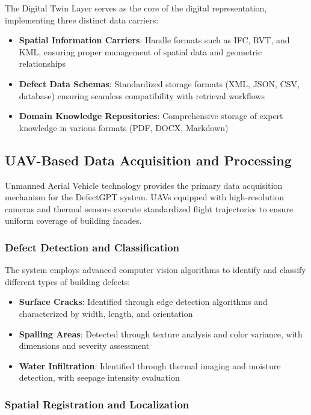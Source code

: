 The Digital Twin Layer serves as the core of the digital representation, implementing three distinct data carriers:

\begin{itemize}
    \item \textbf{Spatial Information Carriers}: Handle formats such as IFC, RVT, and KML, ensuring proper management of spatial data and geometric relationships
    \item \textbf{Defect Data Schemas}: Standardized storage formats (XML, JSON, CSV, database) ensuring seamless compatibility with retrieval workflows
    \item \textbf{Domain Knowledge Repositories}: Comprehensive storage of expert knowledge in various formats (PDF, DOCX, Markdown)
\end{itemize}

\subsection{UAV-Based Data Acquisition and Processing}

Unmanned Aerial Vehicle technology provides the primary data acquisition mechanism for the DefectGPT system. UAVs equipped with high-resolution cameras and thermal sensors execute standardized flight trajectories to ensure uniform coverage of building facades.

\subsubsection{Defect Detection and Classification}

The system employs advanced computer vision algorithms to identify and classify different types of building defects:

\begin{itemize}
    \item \textbf{Surface Cracks}: Identified through edge detection algorithms and characterized by width, length, and orientation
    \item \textbf{Spalling Areas}: Detected through texture analysis and color variance, with dimensions and severity assessment
    \item \textbf{Water Infiltration}: Identified through thermal imaging and moisture detection, with seepage intensity evaluation
\end{itemize}

\subsubsection{Spatial Registration and Localization}

